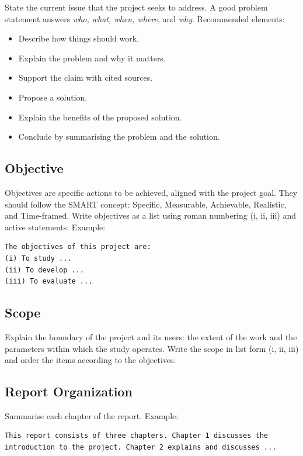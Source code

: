 State the current issue that the project seeks to address. A good problem statement answers \emph{who, what, when, where}, and \emph{why}. Recommended elements:

\begin{itemize}
    \item Describe how things should work.
    \item Explain the problem and why it matters.
    \item Support the claim with cited sources.
    \item Propose a solution.
    \item Explain the benefits of the proposed solution.
    \item Conclude by summarising the problem and the solution.
\end{itemize}

\subsection{Objective}

Objectives are specific actions to be achieved, aligned with the project goal. They should follow the SMART concept: Specific, Measurable, Achievable, Realistic, and Time-framed. Write objectives as a list using roman numbering (i, ii, iii) and active statements. Example:

\begin{verbatim}
The objectives of this project are:
(i) To study ...
(ii) To develop ...
(iii) To evaluate ...
\end{verbatim}

\subsection{Scope}

Explain the boundary of the project and its users: the extent of the work and the parameters within which the study operates. Write the scope in list form (i, ii, iii) and order the items according to the objectives.

\subsection{Report Organization}

Summarise each chapter of the report. Example:

\begin{verbatim}
This report consists of three chapters. Chapter 1 discusses the
introduction to the project. Chapter 2 explains and discusses ...
\end{verbatim}

